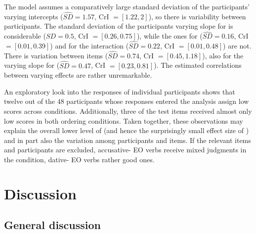 \documentclass[output=paper,colorlinks,citecolor=brown]{langscibook}
\begin{document}
The model assumes a comparatively large standard deviation of the participants' varying intercepts ($\hat{SD} = 1.57$, CrI $= [1.22, 2]$), so there is variability between participants.
The standard deviation of the participants varying slope for  is considerable ($\hat{SD} = 0.5$, CrI $= [0.26, 0.75]$), while the ones for  ($\hat{SD} = 0.16$, CrI $= [0.01, 0.39]$) and for the interaction ($\hat{SD} = 0.22$, CrI $= [0.01, 0.48]$) are not.
There is variation between items ($\hat{SD} = 0.74$, CrI $= [0.45, 1.18]$), also for the varying slope for  ($\hat{SD} = 0.47$, CrI $= [0.23, 0.81]$).
The estimated correlations between varying effects are rather unremarkable.

An exploratory look into the responses of individual participants shows that twelve out of the 48 participants whose responses entered the analysis assign low scores across conditions.
Additionally, three of the test items received almost only low scores in both ordering conditions.
Taken together, these observations may explain the overall lower level of  (and hence the surprisingly small effect size of ) and in part also the variation among participants and items.
If the relevant items and participants are excluded, accusative- EO verbs receive mixed judgments in the  condition, dative- EO verbs rather good ones.

\section{Discussion}
\label{sec:discussion:Masloch}

\subsection{General discussion}
\end{document}
